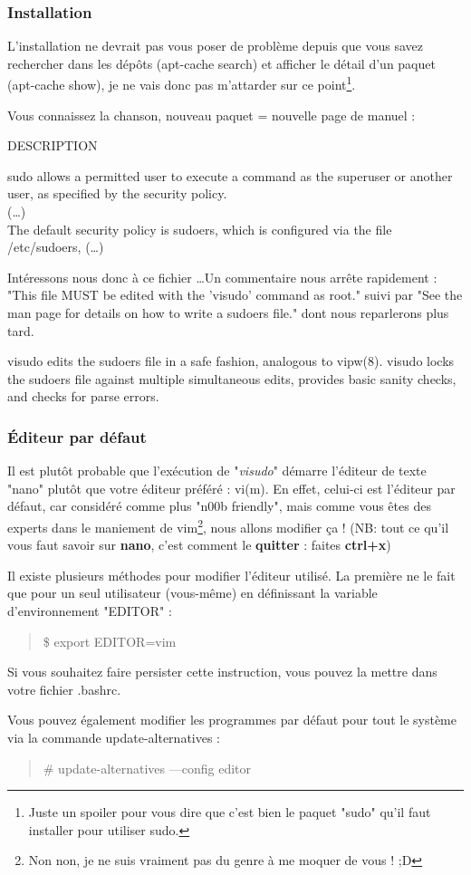 \documentclass[a4paper,11pt]{article}
\newcommand{\commande}[1] {
    \begin{quote}
    \tt\raggedright #1
    \end{quote}
}
\newcommand{\man}[2]{
    \begin{tcolorbox}[toprule=3mm,width=\textwidth,outer arc=0mm,colbacktitle=grayman,coltitle=black,colback={grayman},colframe={grayman},title={man : \tt #1}]
        \tt\raggedright #2
    \end{tcolorbox}
}
\newcommand{\mandesc}[1]{
    \begin{adjustwidth}{0.8cm}{}
        #1
    \end{adjustwidth}
}
\begin{document}
\subsubsection{Installation}
\par L'installation ne devrait pas vous poser de problème depuis que vous savez rechercher dans les dépôts (apt-cache search) et afficher le détail d'un paquet (apt-cache show), je ne vais donc pas m'attarder sur ce point\footnote{Juste un spoiler pour vous dire que c'est bien le paquet "sudo" qu'il faut installer pour utiliser sudo.}.
\par Vous connaissez la chanson, nouveau paquet = nouvelle page de manuel :
\man{sudo}{DESCRIPTION
\mandesc{sudo allows a permitted user to execute a command as the superuser or another user, as specified by the security policy.\\
(\dots)\\
The default security policy is sudoers, which is configured via the file /etc/sudoers, (\dots)}}
\par Intéressons nous donc à ce fichier \ldots  Un commentaire nous arrête rapidement : "This file MUST be edited with the 'visudo' command as root." suivi par "See the man page for details on how to write a sudoers file." dont nous reparlerons plus tard.
\man{visudo}{visudo edits the sudoers file in a safe fashion, analogous to vipw(8). visudo locks the sudoers file against multiple simultaneous edits, provides basic sanity checks, and checks for parse errors.}

\subsubsection{Éditeur par défaut}
\par Il est plutôt probable que l'exécution de "\emph{visudo}" démarre l'éditeur de texte "nano" plutôt que votre éditeur préféré : vi(m). En effet, celui-ci est l'éditeur par défaut, car considéré comme plus "n00b friendly", mais comme vous êtes des experts dans le maniement de vim\footnote{Non non, je ne suis vraiment pas du genre à me moquer de vous ! ;D}, nous allons modifier ça ! (NB: tout ce qu'il vous faut savoir sur \textbf{nano}, c'est comment le \textbf{quitter} : faites \textbf{ctrl+x})
\par Il existe plusieurs méthodes pour modifier l'éditeur utilisé. La première ne le fait que pour un seul utilisateur (vous-même) en définissant la variable d'environnement "EDITOR" :
\commande{\$ export EDITOR=vim}
\par Si vous souhaitez faire persister cette instruction, vous pouvez la mettre dans votre fichier .bashrc.
\par Vous pouvez également modifier les programmes par défaut pour tout le système via la commande update-alternatives :
\commande{\# update-alternatives ---config editor}
\end{document}
